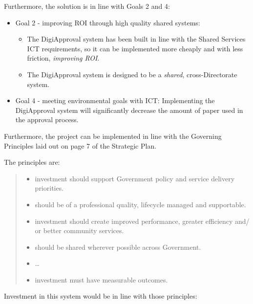 \documentclass[12pt,a4paper,twosided]{article}
\begin{document}
Furthermore, the solution is in line with Goals 2 and 4:

\begin{itemize}

\item
  Goal 2 - improving ROI through high quality shared systems:

  \begin{itemize}
  
  \item
    The DigiApproval system has been built in line with the Shared
    Services ICT requirements, so it can be implemented more cheaply and
    with less friction, \emph{improving ROI}.
  \item
    The DigiApproval system is designed to be a \emph{shared},
    cross-Directorate system.
  \end{itemize}
\item
  Goal 4 - meeting environmental goals with ICT: Implementing the DigiApproval system will significantly
  decrease the amount of paper used in the approval process.
\end{itemize}

Furthermore, the project can be implemented in line with the Governing
Principles laid out on page 7 of the Strategic Plan.

The principles are:

\begin{quote}
\begin{itemize}

\item
  investment should support Government policy and service delivery
  priorities.
\item
  should be of a professional quality, lifecycle managed and
  supportable.
\item
  investment should create improved performance, greater efficiency and/
  or better community services.
\item
  should be shared wherever possible across Government.
\item
  \ldots{}
\item
  investment must have measurable outcomes.
\end{itemize}
\end{quote}

Investment in this system would be in line with those principles:
\end{document}
